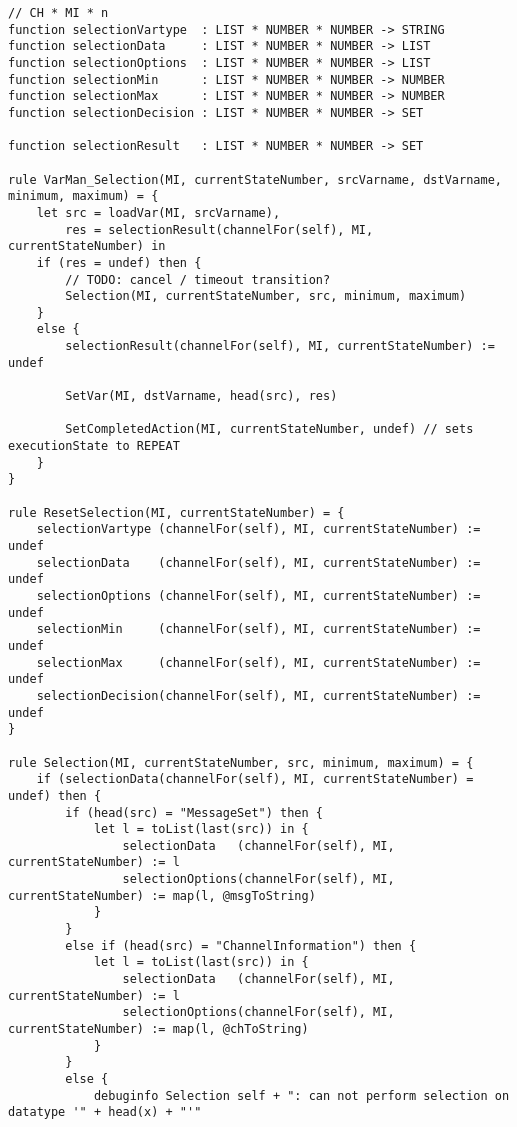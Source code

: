 \begin{listing}[H]
\begin{verbatim}
// CH * MI * n
function selectionVartype  : LIST * NUMBER * NUMBER -> STRING
function selectionData     : LIST * NUMBER * NUMBER -> LIST
function selectionOptions  : LIST * NUMBER * NUMBER -> LIST
function selectionMin      : LIST * NUMBER * NUMBER -> NUMBER
function selectionMax      : LIST * NUMBER * NUMBER -> NUMBER
function selectionDecision : LIST * NUMBER * NUMBER -> SET

function selectionResult   : LIST * NUMBER * NUMBER -> SET

rule VarMan_Selection(MI, currentStateNumber, srcVarname, dstVarname, minimum, maximum) = {
    let src = loadVar(MI, srcVarname),
        res = selectionResult(channelFor(self), MI, currentStateNumber) in
    if (res = undef) then {
        // TODO: cancel / timeout transition?
        Selection(MI, currentStateNumber, src, minimum, maximum)
    }
    else {
        selectionResult(channelFor(self), MI, currentStateNumber) := undef

        SetVar(MI, dstVarname, head(src), res)

        SetCompletedAction(MI, currentStateNumber, undef) // sets executionState to REPEAT
    }
}

rule ResetSelection(MI, currentStateNumber) = {
    selectionVartype (channelFor(self), MI, currentStateNumber) := undef
    selectionData    (channelFor(self), MI, currentStateNumber) := undef
    selectionOptions (channelFor(self), MI, currentStateNumber) := undef
    selectionMin     (channelFor(self), MI, currentStateNumber) := undef
    selectionMax     (channelFor(self), MI, currentStateNumber) := undef
    selectionDecision(channelFor(self), MI, currentStateNumber) := undef
}

rule Selection(MI, currentStateNumber, src, minimum, maximum) = {
    if (selectionData(channelFor(self), MI, currentStateNumber) = undef) then {
        if (head(src) = "MessageSet") then {
            let l = toList(last(src)) in {
                selectionData   (channelFor(self), MI, currentStateNumber) := l
                selectionOptions(channelFor(self), MI, currentStateNumber) := map(l, @msgToString)
            }
        }
        else if (head(src) = "ChannelInformation") then {
            let l = toList(last(src)) in {
                selectionData   (channelFor(self), MI, currentStateNumber) := l
                selectionOptions(channelFor(self), MI, currentStateNumber) := map(l, @chToString)
            }
        }
        else {
            debuginfo Selection self + ": can not perform selection on datatype '" + head(x) + "'"


\end{verbatim}
\end{listing}
